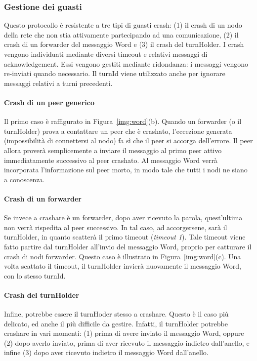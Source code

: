 \documentclass[9pt]{article}
\begin{document}
\subsubsection*{Gestione dei guasti}
Questo protocollo è resistente a tre tipi di guasti crash: (1) il crash di un nodo della rete che non stia attivamente partecipando ad una comunicazione, (2) il crash di un forwarder del messaggio Word e (3) il crash del turnHolder. I crash vengono individuati mediante diversi timeout e relativi messaggi di acknowledgement. Essi vengono gestiti mediante ridondanza: i messaggi vengono re-inviati quando necessario. Il turnId viene utilizzato anche per ignorare messaggi relativi a turni precedenti.

\paragraph{Crash di un peer generico}
Il primo caso è raffigurato in Figura~\ref{img:word}(b). Quando un forwarder (o il turnHolder) prova a contattare un peer che è crashato, l'eccezione generata (impossibilità di connettersi al nodo) fa sì che il peer si accorga dell'errore. Il peer allora proverà semplicemente a inviare il messaggio al primo peer attivo immediatamente successivo al peer crashato. Al messaggio Word verrà incorporata l'informazione sul peer morto, in modo tale che tutti i nodi ne siano a conoscenza.

\paragraph{Crash di un forwarder}
Se invece a crashare è un forwarder, dopo aver ricevuto la parola, quest'ultima non verrà rispedita al peer successivo. In tal caso, ad accorgersene, sarà il turnHolder, in quanto scatterà il primo timeout (\emph{timeout 1}). Tale timeout viene fatto partire dal turnHolder all'invio del messaggio Word, proprio per catturare il crash di nodi forwarder. Questo caso è illustrato in Figura~\ref{img:word}(c). Una volta scattato il timeout, il turnHolder invierà nuovamente il messaggio Word, con lo stesso turnId.

\paragraph{Crash del turnHolder}
Infine, potrebbe essere il turnHoder stesso a crashare. Questo è il caso più delicato, ed anche il più difficile da gestire. Infatti, il turnHolder potrebbe crashare in vari momenti: (1) prima di avere inviato il messaggio Word, oppure (2) dopo averlo inviato, prima di aver ricevuto il messaggio indietro dall'anello, e infine (3) dopo aver ricevuto indietro il messaggio Word dall'anello.
\end{document}
